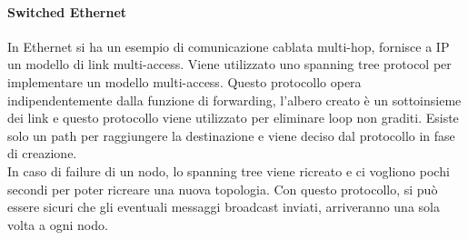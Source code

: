 \documentclass{article}
\begin{document}
\paragraph{Switched Ethernet}
In Ethernet si ha un esempio di comunicazione cablata multi-hop, fornisce a IP un modello di link multi-access. Viene utilizzato uno spanning tree protocol per implementare un modello multi-access. Questo protocollo opera indipendentemente dalla funzione di forwarding, l'albero creato è un sottoinsieme dei link e questo protocollo viene utilizzato per eliminare loop non graditi. Esiste solo un path per raggiungere la destinazione e viene deciso dal protocollo in fase di creazione. \\ In caso di failure di un nodo, lo spanning tree viene ricreato e ci vogliono pochi secondi per poter ricreare una nuova topologia. Con questo protocollo, si può essere sicuri che gli eventuali messaggi broadcast inviati, arriveranno una sola volta a ogni nodo.
\end{document}
